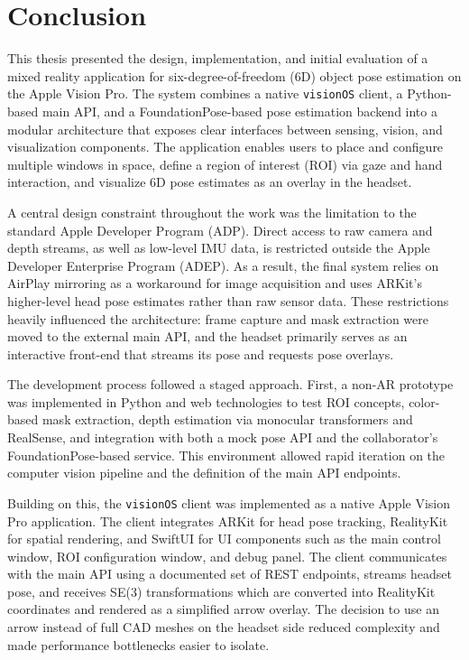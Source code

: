\section{Conclusion}

This thesis presented the design, implementation, and initial evaluation of a mixed reality application for six-degree-of-freedom (6D) object pose estimation on the Apple Vision Pro. The system combines a native \texttt{visionOS} client, a Python-based main API, and a FoundationPose-based pose estimation backend into a modular architecture that exposes clear interfaces between sensing, vision, and visualization components. The application enables users to place and configure multiple windows in space, define a region of interest (ROI) via gaze and hand interaction, and visualize 6D pose estimates as an overlay in the headset.

A central design constraint throughout the work was the limitation to the standard Apple Developer Program (ADP). Direct access to raw camera and depth streams, as well as low-level IMU data, is restricted outside the Apple Developer Enterprise Program (ADEP). As a result, the final system relies on AirPlay mirroring as a workaround for image acquisition and uses ARKit’s higher-level head pose estimates rather than raw sensor data. These restrictions heavily influenced the architecture: frame capture and mask extraction were moved to the external main API, and the headset primarily serves as an interactive front-end that streams its pose and requests pose overlays.

The development process followed a staged approach. First, a non-AR prototype was implemented in Python and web technologies to test ROI concepts, color-based mask extraction, depth estimation via monocular transformers and RealSense, and integration with both a mock pose API and the collaborator’s FoundationPose-based service. This environment allowed rapid iteration on the computer vision pipeline and the definition of the main API endpoints.  

Building on this, the \texttt{visionOS} client was implemented as a native Apple Vision Pro application. The client integrates ARKit for head pose tracking, RealityKit for spatial rendering, and SwiftUI for UI components such as the main control window, ROI configuration window, and debug panel. The client communicates with the main API using a documented set of REST endpoints, streams headset pose, and receives SE(3) transformations which are converted into RealityKit coordinates and rendered as a simplified arrow overlay. The decision to use an arrow instead of full CAD meshes on the headset side reduced complexity and made performance bottlenecks easier to isolate.

